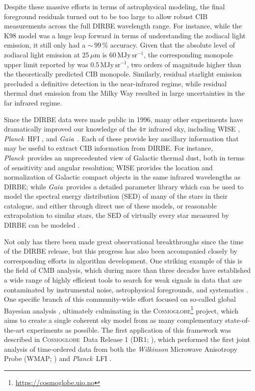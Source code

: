 \documentclass{aa}
\def\Planck{\textit{Planck}}
\def\Gaia{\textit{Gaia}}
\newcommand{\cosmoglobe}{\textsc{Cosmoglobe}}
\def\Planck{\textit{Planck}}
\def\Gaia{\textit{Gaia}}
\begin{document}
Despite these massive efforts in terms of astrophysical modeling, the final foreground residuals turned out to be too large to allow robust CIB measurements across the full DIRBE wavelength range. For instance, while the K98 model was a huge leap forward in terms of understanding the zodiacal light emission, it still only had a $\sim$\,$99\,\%$ accuracy. Given that the absolute level of zodiacal light emission at 25$\,\mu\mathrm{m}$ is 60\,$\mathrm{MJy\,sr^{-1}}$, the corresponding monopole upper limit reported by \citet{hauser1998} was 0.5\,$\mathrm{MJy\,sr^{-1}}$, two orders of magnitude higher than the theoretically predicted CIB monopole. Similarly, residual starlight emission precluded a definitive detection in the near-infrared regime, while residual thermal dust emission from the Milky Way resulted in large uncertainties in the far infrared regime. 

Since the DIRBE data were made public in 1996, many other experiments have dramatically improved our knowledge of the $4\pi$ infrared sky, including WISE \citep{wright:2010}, \Planck\ HFI \citep{planck2016-l03}, and \Gaia\ \citep{gaia:2016}. Each of these provide key ancillary information that may be useful to extract CIB information from  DIRBE. For instance, \Planck\ provides an unprecedented view of Galactic thermal dust, both in terms of sensitivity and angular resolution; WISE provides the location and normalization of Galactic compact objects in the same infrared wavelengths as DIRBE; while \Gaia\ provides a detailed parameter library which can be used to model the spectral energy distribution (SED) of many of the stars in their catalogue, and either through direct use of these models, or reasonable extrapolation to similar stars, the SED of virtually every star measured by DIRBE can be modeled \citep{CG02_04}.

Not only has there been made great observational breakthroughs since the time of the DIRBE release, but this progress has also been accompanied closely by corresponding efforts in algorithm development. One striking example of this is the field of CMB analysis, which during more than three decades have established a wide range of highly efficient tools to search for weak signals in data that are contaminated by instrumental noise, astrophysical foregrounds, and systematics \citep[e.g.,][]{bennett2012,pb2015,planck2016-l01}. One specific branch of this community-wide effort focused on so-called global Bayesian analysis \citep{jewell2004,wandelt2004}, ultimately culminating in the \cosmoglobe\footnote{\url{https://cosmoglobe.uio.no}}  project, which aims to create a single coherent sky model from as many complementary state-of-the-art experiments as possible. The first application of this framework was described in \cosmoglobe\ Data Release 1 (DR1; \citealp{watts2023_dr1}), which performed the first joint analysis of time-ordered data from both the \textit{Wilkinson} Microwave Anisotropy Probe (WMAP; \citealp{bennett2012}) and \Planck\ LFI \citep{planck2016-l02,bp01}. 
\end{document}
